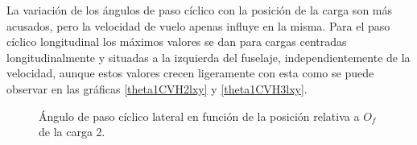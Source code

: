 La variación de los ángulos de paso cíclico con la posición de la carga son más acusados, pero la velocidad de vuelo apenas influye en la misma. Para el paso cíclico longitudinal los máximos valores se dan para cargas centradas longitudinalmente y situadas a la izquierda del fuselaje, independientemente de la velocidad, aunque estos valores crecen ligeramente con esta como se puede observar en las gráficas \ref{theta1CVH2lxy} y \ref{theta1CVH3lxy}.

\begin{figure}
	\centering
	\caption{Ángulo de paso cíclico lateral en función de la posición relativa a $O_f$ de la carga 2.}
	\label{theta1SVH2lxy}
\end{figure}
